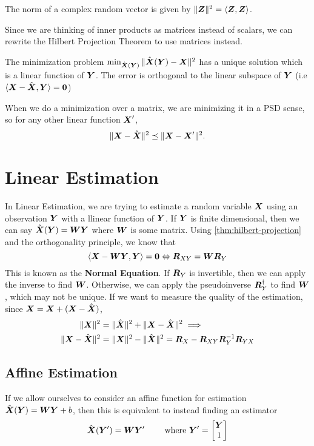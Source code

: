 \begin{definition}
	The norm of a complex random vector is given by $\|\boldsymbol{Z}\|^2 = \langle \boldsymbol{Z}, \boldsymbol{Z} \rangle$.
	\label{defn:norm}
\end{definition}
Since we are thinking of inner products as matrices instead of scalars, we can rewrite the Hilbert Projection Theorem to use matrices instead.
\begin{theorem}
	The minimization problem $\min_{\hat{\boldsymbol{X}}(\boldsymbol{Y})}\|\hat{\boldsymbol{X}}(\boldsymbol{Y}) - \boldsymbol{X}\|^2$ has a unique solution which is a linear function of $\boldsymbol{Y}$. The error is orthogonal to the linear subspace of $\boldsymbol{Y}$ (i.e $\langle \boldsymbol{X} - \hat{\boldsymbol{X}}, \boldsymbol{Y} \rangle = \boldsymbol{0}$)
	\label{thm:hilbert-projection}
\end{theorem}
When we do a minimization over a matrix, we are minimizing it in a PSD sense, so for any other linear function $\boldsymbol{X}'$, \[
	\|\boldsymbol{X}-\hat{\boldsymbol{X}}\|^2  \preceq \|\boldsymbol{X} - \boldsymbol{X}'\|^2.
\]
\section{Linear Estimation}
In Linear Estimation, we are trying to estimate a random variable $\boldsymbol{X}$ using an observation $\boldsymbol{Y}$ with a llinear function of $\boldsymbol{Y}$.
If $\boldsymbol{Y}$ is finite dimensional, then we can say $\hat{\boldsymbol{X}}(\boldsymbol{Y}) = \boldsymbol{W}\boldsymbol{Y}$ where $\boldsymbol{W}$ is some matrix.
Using \cref{thm:hilbert-projection} and the orthogonality principle, we know that
\[
	\langle \boldsymbol{X}-\boldsymbol{W}\boldsymbol{Y}, \boldsymbol{Y} \rangle = \boldsymbol{0} \Leftrightarrow \boldsymbol{R}_{XY} = \boldsymbol{W}\boldsymbol{R}_Y
\]
This is known as the \textbf{Normal Equation}.
If $\boldsymbol{R}_Y$ is invertible, then we can apply the inverse to find $\boldsymbol{W}$.
Otherwise, we can apply the pseudoinverse $\boldsymbol{R}_Y^\dagger$ to find $\boldsymbol{W}$, which may not be unique.
If we want to measure the quality of the estimation, since $\boldsymbol{X} = \boldsymbol{X}+(\boldsymbol{X}-\hat{\boldsymbol{X}})$,
\begin{align*}
	\|\boldsymbol{X}\|^2 &= \|\hat{\boldsymbol{X}}\|^2 + \|\boldsymbol{X} - \hat{\boldsymbol{X}}\|^2 \implies \\
	\|\boldsymbol{X}-\hat{\boldsymbol{X}}\|^2 &= \|\boldsymbol{X}\|^2 - \|\hat{\boldsymbol{X}}\|^2 = \boldsymbol{R}_X - \boldsymbol{R}_{XY}\boldsymbol{R}_Y^{-1}\boldsymbol{R}_{YX}
\end{align*}
\subsection{Affine Estimation}
If we allow ourselves to consider an affine function for estimation $\hat{\boldsymbol{X}}(\boldsymbol{Y}) = \boldsymbol{W}\boldsymbol{Y}+b$, then this is equivalent to instead finding an estimator
\[
	\hat{\boldsymbol{X}}(\boldsymbol{Y}') = \boldsymbol{W}\boldsymbol{Y}' \qquad \text{ where } \boldsymbol{Y}' = \begin{bmatrix} \boldsymbol{Y} \\ 1 \end{bmatrix}
\]

